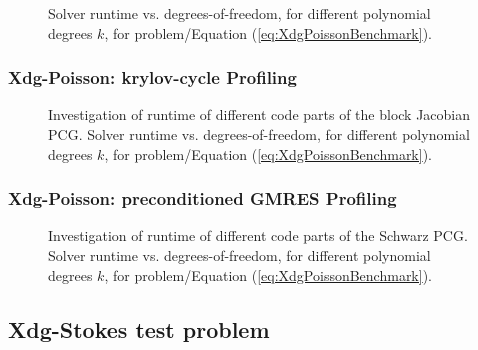 \begin{figure}[!h]
	\begin{center}
	\end{center}
	\caption{
		Solver runtime vs. degrees-of-freedom, for different polynomial degrees $k$,
		for problem/Equation (\ref{eq:XdgPoissonBenchmark}).
	}
	\label{fig:XdgRuntimes}
\end{figure}
\newpage

\subsubsection{Xdg-Poisson: krylov-cycle Profiling}


\begin{figure}[!h]
	\begin{center}
	\end{center}
	\caption{
		Investigation of runtime of different code parts of the block Jacobian PCG. Solver runtime vs. degrees-of-freedom, for different polynomial degrees $k$,
		for problem/Equation (\ref{eq:XdgPoissonBenchmark}).
	}
	\label{fig:Xdg_blockJacobianPCG}
\end{figure}

\subsubsection{Xdg-Poisson: preconditioned GMRES Profiling}


\newpage
\begin{figure}[!h]
	\begin{center}
	\end{center}
	\caption{
		Investigation of runtime of different code parts of the Schwarz PCG. Solver runtime vs. degrees-of-freedom, for different polynomial degrees $k$,
		for problem/Equation (\ref{eq:XdgPoissonBenchmark}).
	}
	\label{fig:Xdg_SchwarzPGC}
\end{figure}
\newpage

\subsection{Xdg-Stokes test problem}

